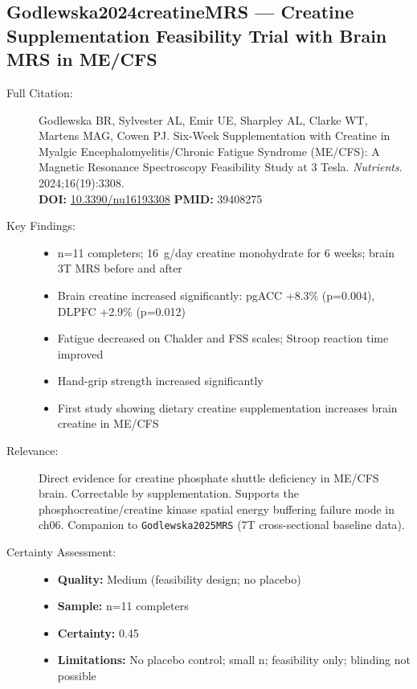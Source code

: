 \subsection*{Godlewska2024creatineMRS --- Creatine Supplementation Feasibility Trial with Brain MRS in ME/CFS}
\begin{description}
    \item[Full Citation:] Godlewska BR, Sylvester AL, Emir UE, Sharpley AL, Clarke WT, Martens MAG, Cowen PJ. Six-Week Supplementation with Creatine in Myalgic Encephalomyelitis/Chronic Fatigue Syndrome (ME/CFS): A Magnetic Resonance Spectroscopy Feasibility Study at 3 Tesla. \textit{Nutrients}. 2024;16(19):3308.\\
    \textbf{DOI:} \href{https://doi.org/10.3390/nu16193308}{10.3390/nu16193308} \quad \textbf{PMID:} 39408275
    \item[Key Findings:]
    \begin{itemize}
        \item n=11 completers; 16~g/day creatine monohydrate for 6 weeks; brain 3T MRS before and after
        \item Brain creatine increased significantly: pgACC +8.3\% (p=0.004), DLPFC +2.9\% (p=0.012)
        \item Fatigue decreased on Chalder and FSS scales; Stroop reaction time improved
        \item Hand-grip strength increased significantly
        \item First study showing dietary creatine supplementation increases brain creatine in ME/CFS
    \end{itemize}
    \item[Relevance:] Direct evidence for creatine phosphate shuttle deficiency in ME/CFS brain. Correctable by supplementation. Supports the phosphocreatine/creatine kinase spatial energy buffering failure mode in ch06. Companion to \texttt{Godlewska2025MRS} (7T cross-sectional baseline data).
    \item[Certainty Assessment:]
    \begin{itemize}
        \item \textbf{Quality:} Medium (feasibility design; no placebo)
        \item \textbf{Sample:} n=11 completers
        \item \textbf{Certainty:} 0.45
        \item \textbf{Limitations:} No placebo control; small n; feasibility only; blinding not possible
    \end{itemize}
\end{description}

